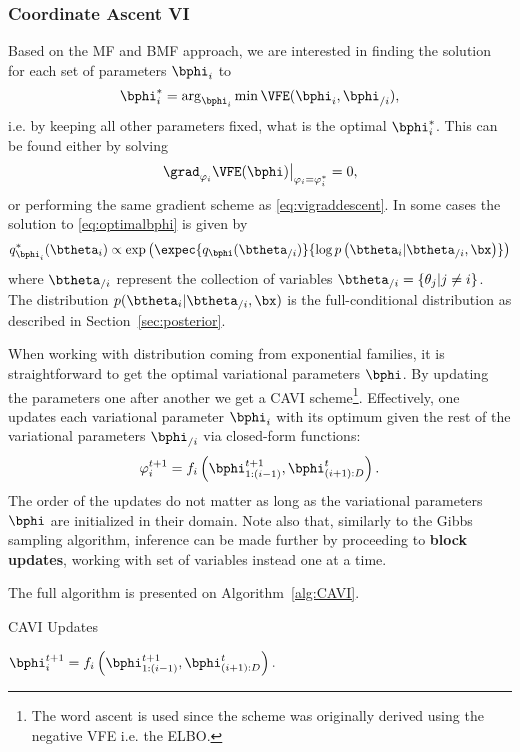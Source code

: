 \subsubsection{Coordinate Ascent VI}
\label{sec:cavi}
Based on the \ac{MF} and \ac{BMF} approach, we are interested in finding the solution for each set of parameters $\bphi_i$ to
\begin{align}
    \bphi_i^* = \arg_{\bphi_i}\min \VFE(\bphi_i, \bphi_{/i}),
    \label{eq:optimalbphi}
\end{align}
i.e. by keeping all other parameters fixed, what is the optimal $\bphi_i^*$.
This can be found either by solving
\begin{align}
\left.\grad_{\varphi_i}\VFE(\bphi)\right\vert_{\varphi_i=\varphi_i^*} = 0,
\end{align}
or performing the same gradient scheme as \eqref{eq:vigraddescent}.
In some cases the solution to \eqref{eq:optimalbphi} is given by
\begin{align}
q_{\bphi_i}^*(\btheta_i) \propto \exp\left(\expec{q_{\bphi}(\btheta_{/i})}{\log p\left(\btheta_i|\btheta_{/i},\bx\right)}\right)
\end{align}
where $\btheta_{/i}$ represent the collection of variables $\btheta_{/i} = \{\theta_j | j \neq i\}$.
The distribution $p(\btheta_i|\btheta_{/i},\bx)$ is the full-conditional distribution as described in Section~\ref{sec:posterior}.

When working with distribution coming from exponential families, it is straightforward to get the optimal variational parameters $\bphi$.
By updating the parameters one after another we get a \ac{CAVI} scheme\footnote{The word ascent is used since the scheme was originally derived using the negative \ac{VFE} i.e. the \ac{ELBO}.}.
Effectively, one updates each variational parameter $\bphi_i$ with its optimum given the rest of the variational parameters $\bphi_{/i}$ via closed-form functions:
\begin{align}
\varphi_i^{t+1} = f_i\left(\bphi_{1:(i-1)}^{t+1}, \bphi_{(i+1):D}^t\right).
\end{align}
The order of the updates do not matter as long as the variational parameters $\bphi$ are initialized in their domain.
Note also that, similarly to the Gibbs sampling algorithm, inference can be made further by proceeding to \textbf{block updates}, working with set of variables instead one at a time.

The full algorithm is presented on Algorithm~\ref{alg:CAVI}.

\begin{algorithm}
    \caption{\ac{CAVI} Updates}
    \label{alg:CAVI}
    \begin{algorithmic}
                \State $\bphi_i^{t+1} = f_i\left(\bphi_{1:(i-1)}^{t+1}, \bphi_{(i+1):D}^t\right).$
            \EndFor
        \EndWhile
    \end{algorithmic}
\end{algorithm}


